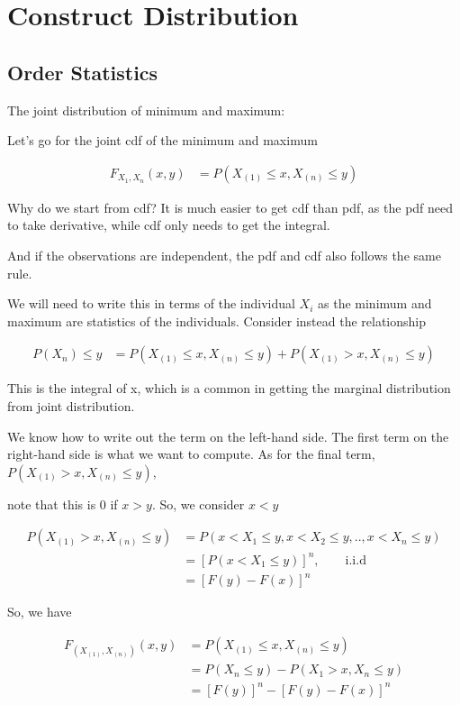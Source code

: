 \documentclass[11pt]{article} %
\begin{document}
\section{Construct Distribution}

\subsection{Order Statistics}
The joint distribution of minimum and maximum:

Let's go for the joint cdf of the minimum and maximum 

\begin{align*}
	F_{X_{1}, X_{n}} (x, y) &= P(X_{(1)} \leq x, X_{(n)} \leq y)  
\end{align*}

Why do we start from cdf? It is much easier to get cdf than pdf, as the pdf need to take derivative, while cdf only needs to get the integral.

And if the observations are independent, the pdf and cdf also follows the same rule. 

We will need to write this in terms of the individual $X_i$ as the minimum and maximum are statistics of the individuals. Consider instead the relationship

\begin{align*}
	P{(X_{n}) \leq y} &= P(X_{(1)} \leq x, X_{(n)} \leq y) + P(X_{(1)} > x, X_{(n)} \leq y)
\end{align*}

This is the integral of x, which is a common in getting the marginal distribution from joint distribution.

We know how to write out the term on the left-hand side. The first term on the right-hand side is what we want to compute. As for the final term, $P(X_{(1)} > x, X_{(n)} \leq y)$,

note that this is 0 if $x > y$. So, we consider $x < y$

\begin{align*}
	P(X_{(1)} > x, X_{(n)} \leq y) &= P(x < X_{1} \leq y, x < X_{2} \leq y, .., x < X_{n} \leq y) \\
	&= [P(x < X_{1} \leq y)]^n, \qquad \text{i.i.d} \\
	&= [F(y)- F(x)]^n
\end{align*}

So, we have 

\begin{align*}
	F_{(X_{(1)}, X_{(n)})} (x,y) &= P(X_{(1)} \leq x, X_{(n)} \leq y) \\
	&= P(X_{n} \leq y) - P(X_{1} > x, X_{n} \leq y) \\
	&= [F(y)]^n - [F(y)- F(x)]^n
\end{align*}
\end{document}
